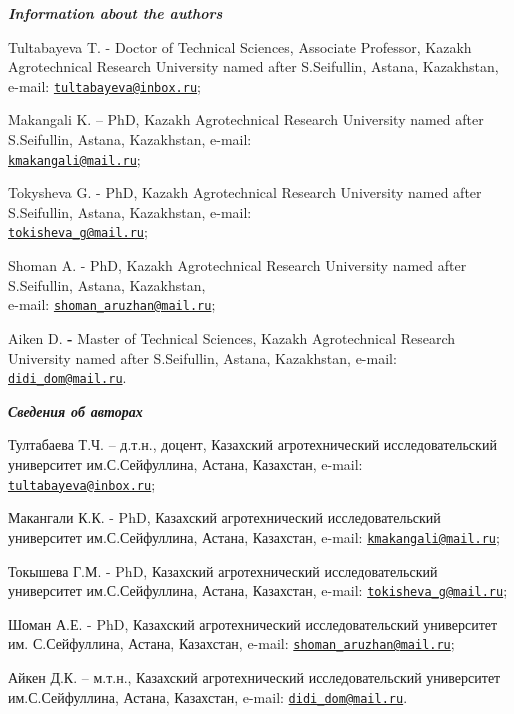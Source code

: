 \begin{authorinfo}
\hspace{1em}\emph{{\bfseries Information about the authors}}

Tultabayeva T. - Doctor of Technical Sciences, Associate Professor,
Kazakh Agrotechnical Research University named after S.Seifullin,
Astana, Kazakhstan, e-mail:
\href{mailto:tultabayeva@inbox.ru}{\nolinkurl{tultabayeva@inbox.ru}};

Makangali K. -- PhD, Kazakh Agrotechnical Research University named
after S.Seifullin, Astana, Kazakhstan, e-mail:\\
\href{mailto:kmakangali@mail.ru}{\nolinkurl{kmakangali@mail.ru}};

Tokysheva G. - PhD, Kazakh Agrotechnical Research University named after
S.Seifullin, Astana, Kazakhstan, e-mail:\\
\href{mailto:tokisheva_g@mail.ru}{\nolinkurl{tokisheva\_g@mail.ru}};

Shoman A. - PhD, Kazakh Agrotechnical Research University named after
S.Seifullin, Astana, Kazakhstan, \\e-mail:
\href{mailto:shoman_aruzhan@mail.ru}{\nolinkurl{shoman\_aruzhan@mail.ru}};

Aiken D. {\bfseries -} Master of Technical Sciences, Kazakh Agrotechnical
Research University named after S.Seifullin, Astana, Kazakhstan, e-mail:
\href{mailto:didi_dom@mail.ru}{\nolinkurl{didi\_dom@mail.ru}}.

\hspace{1em}\emph{{\bfseries Сведения об авторах}}

Тултабаева Т.Ч. -- д.т.н., доцент, Казахский агротехнический
исследовательский университет им.С.Сейфуллина, Астана, Казахстан,
e-mail:
\href{mailto:tultabayeva@inbox.ru}{\nolinkurl{tultabayeva@inbox.ru}};

Макангали К.К. - PhD, Казахский агротехнический исследовательский
университет им.С.Сейфуллина, Астана, Казахстан, e-mail:
\href{mailto:kmakangali@mail.ru}{\nolinkurl{kmakangali@mail.ru}};

Токышева Г.М. - PhD, Казахский агротехнический исследовательский
университет им.С.Сейфуллина, Астана, Казахстан, e-mail:
\href{mailto:tokisheva_g@mail.ru}{\nolinkurl{tokisheva\_g@mail.ru}};

Шоман А.Е. - PhD, Казахский агротехнический исследовательский
университет им. С.Сейфуллина, Астана, Казахстан, e-mail:
\href{mailto:shoman_aruzhan@mail.ru}{\nolinkurl{shoman\_aruzhan@mail.ru}};

Айкен Д.К. -- м.т.н., Казахский агротехнический исследовательский
университет им.С.Сейфуллина, Астана, Казахстан, e-mail:
\href{mailto:didi_dom@mail.ru}{\nolinkurl{didi\_dom@mail.ru}}.
\end{authorinfo}
